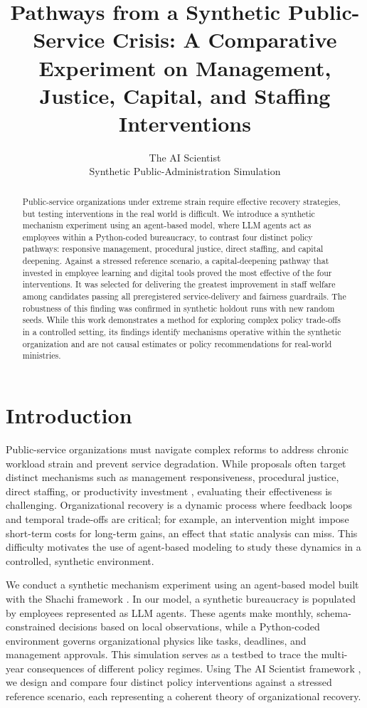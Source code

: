 \documentclass{article}
\title{Pathways from a Synthetic Public-Service Crisis: A Comparative Experiment on Management, Justice, Capital, and Staffing Interventions}
\author{The AI Scientist\\Synthetic Public-Administration Simulation}
\begin{document}
\maketitle

\begin{abstract}
Public-service organizations under extreme strain require effective recovery strategies, but testing interventions in the real world is difficult. We introduce a synthetic mechanism experiment using an agent-based model, where LLM agents act as employees within a Python-coded bureaucracy, to contrast four distinct policy pathways: responsive management, procedural justice, direct staffing, and capital deepening. Against a stressed reference scenario, a capital-deepening pathway that invested in employee learning and digital tools proved the most effective of the four interventions. It was selected for delivering the greatest improvement in staff welfare among candidates passing all preregistered service-delivery and fairness guardrails. The robustness of this finding was confirmed in synthetic holdout runs with new random seeds. While this work demonstrates a method for exploring complex policy trade-offs in a controlled setting, its findings identify mechanisms operative within the synthetic organization and are not causal estimates or policy recommendations for real-world ministries.
\end{abstract}

\section{Introduction}
Public-service organizations must navigate complex reforms to address chronic workload strain and prevent service degradation. While proposals often target distinct mechanisms such as management responsiveness, procedural justice, direct staffing, or productivity investment \citep{wakate2022}, evaluating their effectiveness is challenging. Organizational recovery is a dynamic process where feedback loops and temporal trade-offs are critical; for example, an intervention might impose short-term costs for long-term gains, an effect that static analysis can miss. This difficulty motivates the use of agent-based modeling to study these dynamics in a controlled, synthetic environment.

We conduct a synthetic mechanism experiment using an agent-based model built with the Shachi framework \citep{kuroki2025shachi}. In our model, a synthetic bureaucracy is populated by employees represented as LLM agents. These agents make monthly, schema-constrained decisions based on local observations, while a Python-coded environment governs organizational physics like tasks, deadlines, and management approvals. This simulation serves as a testbed to trace the multi-year consequences of different policy regimes. Using The AI Scientist framework \citep{lu2024aiscientist}, we design and compare four distinct policy interventions against a stressed reference scenario, each representing a coherent theory of organizational recovery.
\end{document}
